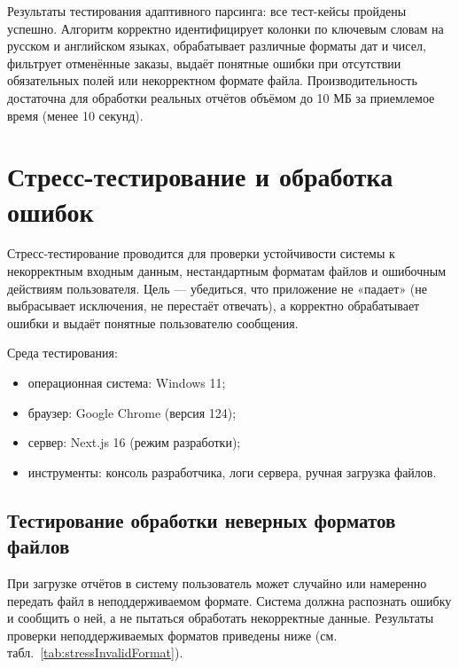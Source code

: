 Результаты тестирования адаптивного парсинга: все тест-кейсы пройдены успешно. Алгоритм корректно идентифицирует колонки по ключевым словам на русском и английском языках, обрабатывает различные форматы дат и чисел, фильтрует отменённые заказы, выдаёт понятные ошибки при отсутствии обязательных полей или некорректном формате файла. Производительность достаточна для обработки реальных отчётов объёмом до 10 МБ за приемлемое время (менее 10 секунд).

\section{Стресс-тестирование и обработка ошибок}

Стресс-тестирование проводится для проверки устойчивости системы к некорректным входным данным, нестандартным форматам файлов и ошибочным действиям пользователя. Цель — убедиться, что приложение не «падает» (не выбрасывает исключения, не перестаёт отвечать), а корректно обрабатывает ошибки и выдаёт понятные пользователю сообщения.

Среда тестирования:
\begin{itemize}
\item операционная система: Windows 11;
\item браузер: Google Chrome (версия 124);
\item сервер: Next.js 16 (режим разработки);
\item инструменты: консоль разработчика, логи сервера, ручная загрузка файлов.
\end{itemize}

\subsection{Тестирование обработки неверных форматов файлов}

При загрузке отчётов в систему пользователь может случайно или намеренно передать файл в неподдерживаемом формате. Система должна распознать ошибку и сообщить о ней, а не пытаться обработать некорректные данные. Результаты проверки неподдерживаемых форматов приведены ниже (см. табл.~\ref{tab:stressInvalidFormat}).

